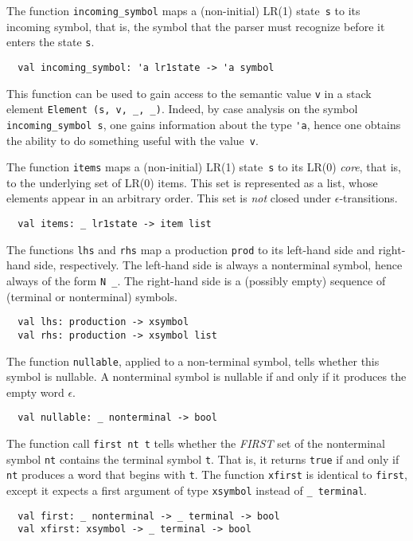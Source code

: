 \documentclass[onecolumn,11pt,nocopyrightspace,preprint]{sigplanconf}
\begin{document}

The function \verb+incoming_symbol+ maps a (non-initial) LR(1)
state~\verb+s+ to its incoming symbol, that is, the symbol that the parser
must recognize before it enters the state \verb+s+.
%
\begin{verbatim}
  val incoming_symbol: 'a lr1state -> 'a symbol
\end{verbatim}
%
This function can be used to gain access to the semantic value \verb+v+
in a stack element \verb+Element (s, v, _, _)+. Indeed, by case analysis on the
symbol \verb+incoming_symbol s+, one gains information about the type \verb+'a+,
hence one obtains the ability to do something useful with the value~\verb+v+.


The function \verb+items+ maps a (non-initial) LR(1) state~\verb+s+ to its
LR(0) \emph{core}, that is, to the underlying set of LR(0) items. This set
is represented as a list, whose elements appear in an arbitrary order. This
set is \emph{not} closed under $\epsilon$-transitions.
%
\begin{verbatim}
  val items: _ lr1state -> item list
\end{verbatim}


The functions \verb+lhs+ and \verb+rhs+ map a production \verb+prod+ to
its left-hand side and right-hand side, respectively. The left-hand side
is always a nonterminal symbol, hence always of the form \verb+N _+. The
right-hand side is a (possibly empty) sequence of (terminal or nonterminal)
symbols.
%
\begin{verbatim}
  val lhs: production -> xsymbol
  val rhs: production -> xsymbol list
\end{verbatim}
%


The function \verb+nullable+, applied to a non-terminal symbol,
tells whether this symbol is nullable. A nonterminal symbol is nullable if and
only if it produces the empty word $\epsilon$.
%
\begin{verbatim}
  val nullable: _ nonterminal -> bool
\end{verbatim}


The function call \verb+first nt t+ tells whether the \emph{FIRST} set of the
nonterminal symbol \verb+nt+ contains the terminal symbol \verb+t+. That is,
it returns \verb+true+ if and only if \verb+nt+ produces a word that begins
with \verb+t+. The function \verb+xfirst+ is identical to \verb+first+, except
it expects a first argument of type \verb+xsymbol+ instead of \verb+_ terminal+.
%
\begin{verbatim}
  val first: _ nonterminal -> _ terminal -> bool
  val xfirst: xsymbol -> _ terminal -> bool
\end{verbatim}
\end{document}
